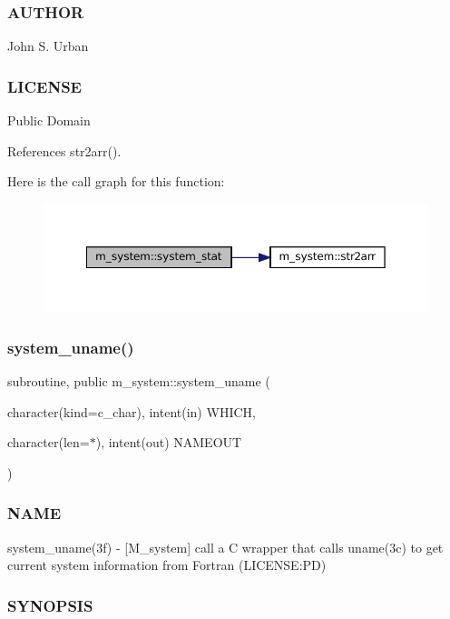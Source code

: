 \subsubsection*{A\+U\+T\+H\+OR}

John S. Urban \subsubsection*{L\+I\+C\+E\+N\+SE}

Public Domain 

References str2arr().

Here is the call graph for this function\+:
\nopagebreak
\begin{figure}[H]
\begin{center}
\leavevmode
\includegraphics[width=350pt]{namespacem__system_a5bb1ebcebe181e07fd24e908cacc9887_cgraph}
\end{center}
\end{figure}
\mbox{\label{namespacem__system_a04e5d49509c44bcb2ccabfd80ec8cdfb}} 
\subsubsection{\texorpdfstring{system\+\_\+uname()}{system\_uname()}}
{\footnotesize\ttfamily subroutine, public m\+\_\+system\+::system\+\_\+uname (\begin{DoxyParamCaption}\item[{character(kind=c\+\_\+char), intent(in)}]{W\+H\+I\+CH,  }\item[{character(len=$\ast$), intent(out)}]{N\+A\+M\+E\+O\+UT }\end{DoxyParamCaption})}



\subsubsection*{N\+A\+ME}

system\+\_\+uname(3f) -\/ \mbox{[}M\+\_\+system\mbox{]} call a C wrapper that calls uname(3c) to get current system information from Fortran (L\+I\+C\+E\+N\+SE\+:PD) \subsubsection*{S\+Y\+N\+O\+P\+S\+IS}

